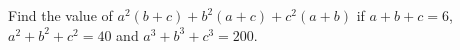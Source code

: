 Find the value of $a^2(b+c)+b^2(a+c)+c^2(a+b)$ if $a+b+c=6$, $a^2+b^2+c^2=40$ and $a^3+b^3+c^3=200$.
